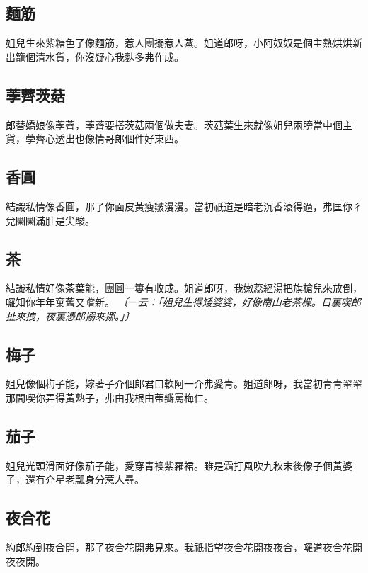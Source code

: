 \subsection*{麵筋}

姐兒生來紫糖色了像麵筋，惹人團搦惹人蒸。姐道郎呀，小阿奴奴是個主熱烘烘新出籠個清水貨，你沒疑心我麩多弗作成。

\subsection*{荸薺茨菇}

郎替嬌娘像荸薺，荸薺要搭茨菇兩個做夫妻。茨菇葉生來就像姐兒兩膀當中個主貨，荸薺心透出也像情哥郎個件好東西。

\subsection*{香圓}

結識私情像香圓，那了你面皮黃瘦皺漫漫。當初祇道是暗老沉香滾得過，弗匡你彳兌圞圞滿肚是尖酸。

\subsection*{茶}

結識私情好像茶葉能，團圓一簍有收成。姐道郎呀，我嫩蕊經湯把旗槍兒來放倒，囉知你年年棄舊又嚐新。
\textit{〔一云：「姐兒生得矮婆娑，好像南山老茶棵。日裏喫郎扯來拽，夜裏憑郎搦來挪。」〕}

\subsection*{梅子}

姐兒像個梅子能，嫁著子介個郎君口軟阿一介弗愛青。姐道郎呀，我當初青青翠翠那間喫你弄得黃熟子，弗由我根由蒂瓣罵梅仁。

\subsection*{茄子}

姐兒光頭滑面好像茄子能，愛穿青襖紫羅裙。雖是霜打風吹九秋末後像子個黃婆子，還有介星老瓢身分惹人尋。

\subsection*{夜合花}

約郎約到夜合開，那了夜合花開弗見來。我祇指望夜合花開夜夜合，囉道夜合花開夜夜開。

